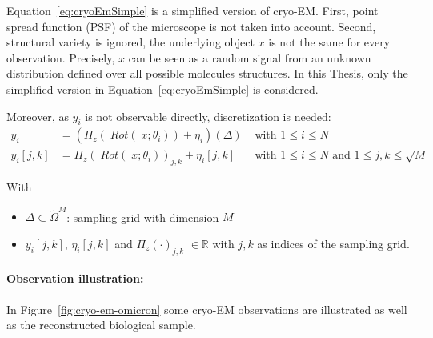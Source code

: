 Equation~\ref{eq:cryoEmSimple} is a simplified version of cryo-EM.
First, point spread function (PSF) of the microscope is not taken into account.
Second, structural variety is ignored, the underlying object $x$ is not the same 
for every observation. 
Precisely, $x$ can be seen as a random signal from an unknown distribution defined over all possible molecules structures.
In this Thesis, only the simplified version in Equation~\ref{eq:cryoEmSimple} is considered.


Moreover, as $y_i$ is not observable directly, discretization is needed:
\begin{equation}
    \label{eq:cryoEmSimpleDiscrete}
    \begin{aligned}
        y_i &= \left( \Pi_z (\; Rot (\;x; \theta_i)) + \eta_i\right)(\Delta) & \text{ with } 1 \leq i \leq N \\
        y_i[j,k] &= \Pi_z (\; Rot(\;x; \theta_i))_{j,k} + \eta_i[j,k] & \text{ with } 1 \leq i \leq N \text{ and } 1 \leq j,k \leq \sqrt{M}
    \end{aligned}
\end{equation}

With
\begin{itemize}
    \item $\Delta \subset \tilde{\Omega}^{M}$: sampling grid with dimension $M$
    \item $y_i[j,k]$, $\eta_i[j,k]$ and $\Pi_z(\cdot)_{j,k}$ $ \in \mathbb{R}$ with $j,k$ as indices of the sampling grid.
\end{itemize}


\paragraph{Observation illustration:}
In Figure~\ref{fig:cryo-em-omicron} some cryo-EM observations are illustrated as well as the reconstructed biological sample.

